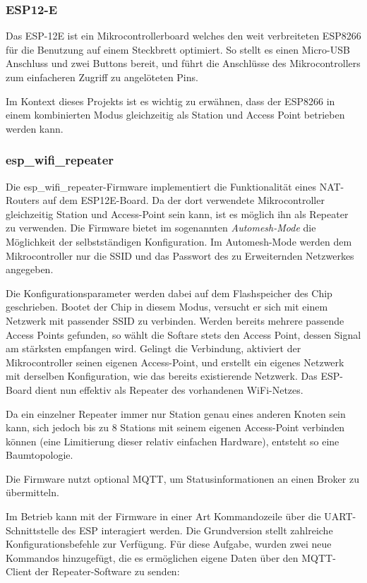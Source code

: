 {		\subsubsection{ESP12-E}
		Das ESP-12E ist ein Mikrocontrollerboard welches den weit verbreiteten ESP8266 für die Benutzung auf einem Steckbrett optimiert. So stellt es \zB einen Micro-USB Anschluss und zwei Buttons bereit, und führt die Anschlüsse des Mikrocontrollers zum einfacheren Zugriff zu angelöteten Pins.
		
		Im Kontext dieses Projekts ist es wichtig zu erwähnen, dass der ESP8266 in einem kombinierten Modus gleichzeitig als Station und Access Point betrieben werden kann.
		
		\subsubsection{esp\_wifi\_repeater}
		Die esp\_wifi\_repeater-Firmware implementiert die Funktionalität eines NAT-Routers auf dem ESP12E-Board. Da der dort verwendete Mikrocontroller gleichzeitig Station und Access-Point sein kann, ist es möglich ihn als Repeater zu verwenden. Die Firmware bietet im sogenannten \emph{Automesh-Mode} die Möglichkeit der selbstständigen Konfiguration. Im Automesh-Mode werden dem Mikrocontroller nur die SSID und das Passwort des zu Erweiternden Netzwerkes angegeben.
		
		Die Konfigurationsparameter werden dabei auf dem Flashspeicher des Chip geschrieben. Bootet der Chip in diesem Modus, versucht er sich mit einem Netzwerk mit passender SSID zu verbinden. Werden bereits mehrere passende Access Points gefunden, so wählt die Softare stets den Access Point, dessen Signal am stärksten empfangen wird. Gelingt die Verbindung, aktiviert der Mikrocontroller seinen eigenen Access-Point, und erstellt ein eigenes Netzwerk mit derselben Konfiguration, wie das bereits existierende Netzwerk. Das ESP-Board dient nun effektiv als Repeater des vorhandenen WiFi-Netzes. 
		
		Da ein einzelner Repeater immer nur Station genau eines anderen Knoten sein kann, sich jedoch bis zu 8 Stations mit seinem eigenen Access-Point verbinden können (eine Limitierung dieser relativ einfachen Hardware), entsteht so eine Baumtopologie. 
			
		Die Firmware nutzt optional MQTT, um Statusinformationen an einen Broker zu übermitteln.
			
		Im Betrieb kann mit der Firmware in einer Art Kommandozeile über die UART-Schnittstelle des ESP interagiert werden. Die Grundversion stellt zahlreiche Konfigurationsbefehle zur Verfügung. Für diese Aufgabe, wurden zwei neue Kommandos hinzugefügt, die es ermöglichen eigene Daten über den MQTT-Client der Repeater-Software zu senden:
			
}
